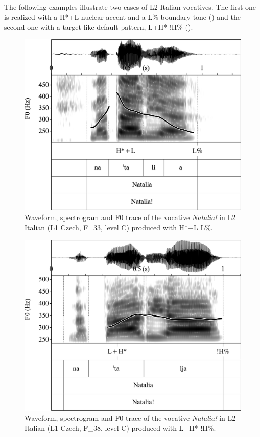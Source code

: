 The following examples illustrate two cases of L2 Italian vocatives. The first one is realized with a H*+L nuclear accent and a L\% boundary tone () and the second one with a target-like default pattern, L+H* !H\% ().

\begin{figure}


\includegraphics[width=.8\textwidth]{figures/Figure_4.143.png}



\caption{Waveform, spectrogram and F0 trace of the vocative \textit{Natalia!} in L2 Italian (L1 Czech, F\_33, level C) produced with H*+L L\%.}
\label{fig:4.143}
\end{figure}

\begin{figure}


\includegraphics[width=.8\textwidth]{figures/Figure_4.144.png}



\caption{Waveform, spectrogram and F0 trace of the vocative \textit{Natalia!} in L2 Italian (L1 Czech, F\_38, level C) produced with L+H* !H\%.}
\label{fig:4.144}
\end{figure}

